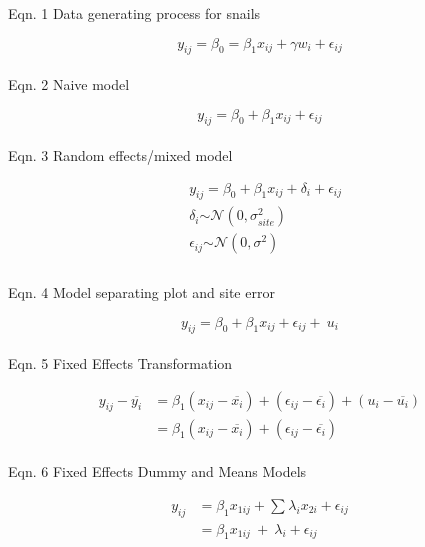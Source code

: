 \documentclass{article}
\begin{document}
Eqn. 1 Data generating process for snails

\begin{equation}
y_{ij} = \beta_0 = \beta_1 x_{ij} + \gamma w_i + \epsilon_{ij}
\end{equation}\\

Eqn. 2 Naive model

\begin{equation}
y_{ij} = \beta_{0} + \beta_{1}x_{ij} + \epsilon_{ij}
\end{equation}\\

Eqn. 3 Random effects/mixed model

\begin{equation}
  \begin{split}
& y_{ij} = \beta_{0} + \beta_{1}x_{ij} + \delta_{i} + \epsilon_{ij} \\
& \delta_{i}\mathcal{\sim N}\left( 0,\sigma_{site}^{2} \right) \\
& \epsilon_{ij}\mathcal{\sim N}\left( 0,\sigma^{2} \right) \\
  \end{split}
\end{equation}\\

Eqn. 4 Model separating plot and site error

\begin{equation}
y_{ij} = \beta_{0} + \beta_{1}x_{ij} + \epsilon_{ij} + \ u_{i}
\end{equation}\\


Eqn. 5 Fixed Effects Transformation

\begin{equation}
  \begin{split}
y_{ij} - \overline{y_{i}} &= \beta_{1}\left( x_{ij} - \overline{x_{i}} \right) + \left( \epsilon_{ij} - \overline{\epsilon_{i}} \right) + \left(u_{i} - \overline{u_{i}} \right) \\
&= \beta_{1}\left( x_{ij} - \overline{x_{i}} \right) + \left( \epsilon_{ij} - \overline{\epsilon_{i}} \right)
  \end{split}
\end{equation}\\


Eqn. 6 Fixed Effects Dummy and Means Models 

\begin{equation}
  \begin{split}
y_{ij} &= \beta_{1}x_{1ij} + \sum_{}^{}{\lambda_{i}x_{2i}} + \epsilon_{ij} \\
&= \beta_{1}x_{1ij}{\  + \ \lambda}_{i} + \epsilon_{ij}  
  \end{split}
\end{equation}\\
\end{document}
